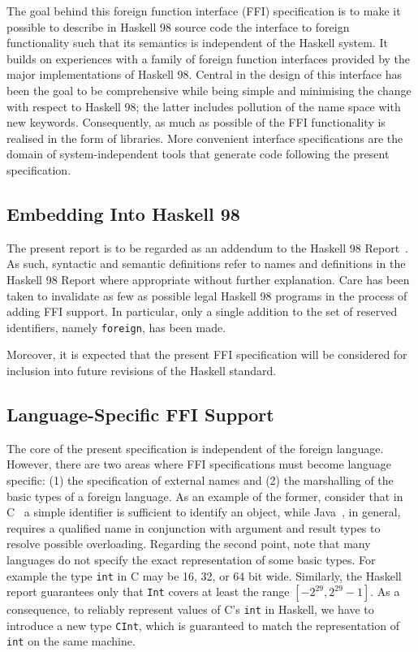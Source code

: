 \documentclass[a4paper,twosides]{article}
\newcommand{\code}[1]{\texttt{#1}}
\begin{document}
The goal behind this foreign function interface (FFI) specification is to make
it possible to describe in Haskell 98 source code the interface to foreign
functionality such that its semantics is independent of the Haskell system.
It builds on experiences with a family of foreign function interfaces provided
by the major implementations of Haskell 98.  Central in the design of this
interface has been the goal to be comprehensive while being simple and
minimising the change with respect to Haskell 98; the latter includes
pollution of the name space with new keywords.  Consequently, as much as
possible of the FFI functionality is realised in the form of libraries.  More
convenient interface specifications are the domain of system-independent tools
that generate code following the present specification.

\subsection{Embedding Into Haskell 98}

The present report is to be regarded as an addendum to the Haskell 98
Report~\cite{haskell98}.  As such, syntactic and semantic definitions refer to
names and definitions in the Haskell 98 Report where appropriate without
further explanation.  Care has been taken to invalidate as few as possible
legal Haskell 98 programs in the process of adding FFI support.  In
particular, only a single addition to the set of reserved identifiers, namely
\code{foreign}, has been made.

Moreover, it is expected that the present FFI specification will be considered
for inclusion into future revisions of the Haskell standard.

\subsection{Language-Specific FFI Support}

The core of the present specification is independent of the foreign language.
However, there are two areas where FFI specifications must become language
specific: (1) the specification of external names and (2) the marshalling of
the basic types of a foreign language.  As an example of the former, consider
that in C~\cite{C} a simple identifier is sufficient to identify an object,
while Java~\cite{gosling-etal:Java}, in general, requires a qualified name in
conjunction with argument and result types to resolve possible overloading.
Regarding the second point, note that many languages do not specify the exact
representation of some basic types.  For example the type \code{int} in C may
be 16, 32, or 64 bit wide.  Similarly, the Haskell report guarantees only that
\code{Int} covers at least the range \([-2^{29}, 2^{29} - 1]\).  As a
consequence, to reliably represent values of C's \code{int} in Haskell, we
have to introduce a new type \code{CInt}, which is guaranteed to match the
representation of \code{int} on the same machine.
\end{document}
